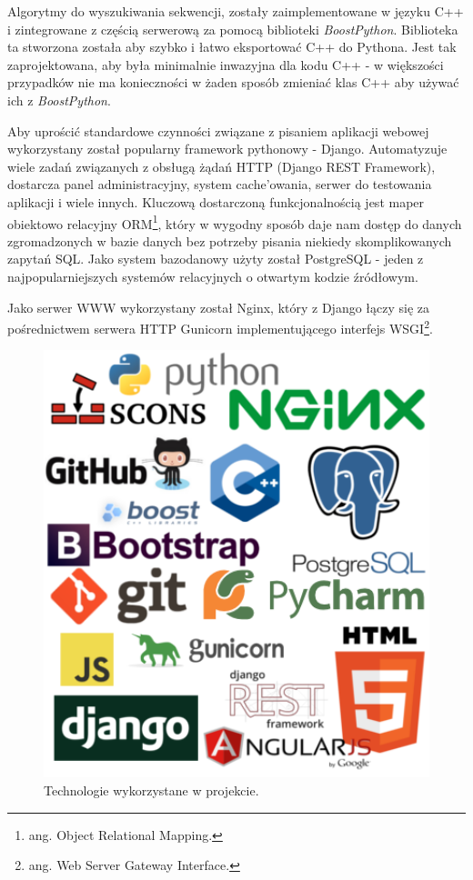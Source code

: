 Algorytmy do wyszukiwania sekwencji, zostały zaimplementowane w języku C++ i zintegrowane z częścią serwerową za pomocą biblioteki \textit{BoostPython}.
Biblioteka ta stworzona została aby szybko i łatwo eksportować C++ do Pythona.
Jest tak zaprojektowana, aby była minimalnie inwazyjna dla kodu C++ - w większości przypadków nie ma konieczności w żaden sposób zmieniać klas C++ aby używać ich z \textit{BoostPython}.

Aby uprościć standardowe czynności związane z pisaniem aplikacji webowej wykorzystany został popularny framework pythonowy - Django. 
Automatyzuje wiele zadań związanych z obsługą żądań HTTP (Django REST Framework), dostarcza panel administracyjny, system cache'owania, serwer do testowania aplikacji i wiele innych.
Kluczową dostarczoną funkcjonalnością jest maper obiektowo relacyjny ORM\footnote{ang. Object Relational Mapping.}, który w wygodny sposób daje nam dostęp do danych zgromadzonych w bazie danych bez potrzeby pisania niekiedy skomplikowanych zapytań SQL.
Jako system bazodanowy użyty został PostgreSQL - jeden z najpopularniejszych systemów relacyjnych o otwartym kodzie źródłowym.

Jako serwer WWW wykorzystany został Nginx, który z Django łączy się za pośrednictwem serwera HTTP Gunicorn implementującego interfejs WSGI\footnote{ang. Web Server Gateway Interface.}.


\begin{figure}[h]
	\centering
	\includegraphics[width=1\textwidth]{img/loga.png}
	\caption{Technologie wykorzystane w projekcie.}
	\vspace{-0.5cm}
	\label{img:technologie}
\end{figure}

